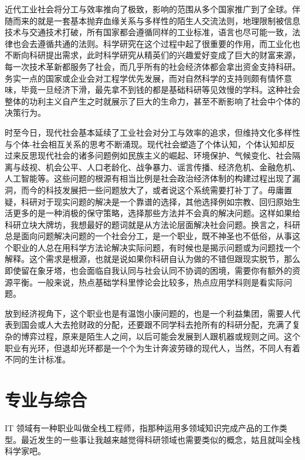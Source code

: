 \documentclass[]{tufte-book}
\begin{document}
近代工业社会将分工与效率推向了极致，影响的范围从多个国家推广到了全球。伴随而来的就是一套基本抛弃血缘关系与多样性的陌生人交流法则，地理限制被信息技术与交通技术打破，所有国家都会遵循同样的工业标准，语言也尽可能一致，法律也会去遵循共通的法则。科学研究在这个过程中起了很重要的作用，而工业化也不断向科研提出需求，此时科学研究从精英们的兴趣爱好变成了巨大的财富来源，每一次技术革新都服务了社会，而几乎所有的社会经济体都会拿出资金支持科研。务实一点的国家或企业会对工程学优先发展，而对自然科学的支持则颇有情怀意味，毕竟一旦经济下滑，最先拿不到钱的都是基础科研等见效慢的学科。这种社会整体的功利主义自产生之时就展示了巨大的生命力，甚至不断影响了社会中个体的决策行为。

时至今日，现代社会基本延续了工业社会对分工与效率的追求，但维持文化多样性与个体-社会相互关系的思考不断涌现。现代社会塑造了个体认知，个体认知却反过来反思现代社会的诸多问题例如民族主义的崛起、环境保护、气候变化、社会隔离与歧视、机会公平、人口老龄化、战争暴力、谣言传播、经济危机、金融危机、人工智能等。这些问题的根源有相当比例是社会政治经济体制的构建过程出现了漏洞，而今的科技发展把一些问题放大了，或者说这个系统需要打补丁了。毋庸置疑，科研对于现实问题的解决是一个靠谱的选择，其他选择例如宗教、回归原始生活更多的是一种消极的保守策略，选择那些方法并不会真的解决问题。这样如果给科研立块大牌坊，我想最好的题词就是从方法论层面解决社会问题。换言之，科研总是面向问题解决问题的一个社会分工，是一个职业，既不神圣也不低俗，从事这个职业的人总在用科学方法论解决实际问题，有时候也是揭示问题或为问题找一个解释。这个需求是根源，也就是说如果你科研自认为做的不错但跟现实脱节，那么即使留在象牙塔，也会面临自我认同与社会认同不协调的困境，需要你有额外的资源平衡。一般来说，热点基础学科里悖论会比较多，热点应用学科则是看实际问题。

放到经济视角下，这个职业也是有温饱小康问题的，也是一个利益集团，需要人代表到国会或人大去抢财政的分配，还要跟不同学科去抢所有的科研分配，充满了复杂的博弈过程，原来是陌生人之间，以后可能会发展到人跟机器或规则之间。这个职业有光环，但退却光环都是一个个为生计奔波劳碌的现代人，当然，不同人有着不同的生计标准。

\hypertarget{ux4e13ux4e1aux4e0eux7efcux5408}{%
\section{专业与综合}\label{ux4e13ux4e1aux4e0eux7efcux5408}}

IT 领域有一种职业叫做全栈工程师，指那种运用多领域知识完成产品的工作类型。最近发生的一些事让我越来越觉得科研领域也需要类似的概念，姑且就叫全栈科学家吧。
\end{document}
